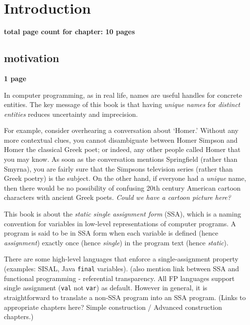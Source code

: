 \chapter{Introduction }

\textbf{total page count for chapter: 10 pages}


\section{motivation}

\textbf{1 page}


In computer programming, as in real life, 
names are useful handles for concrete entities.
The key message of this book is that
having \textit{unique names} for
\textit{distinct entities}
reduces uncertainty and imprecision.

For example, consider overhearing a conversation
about `Homer.' Without any more contextual clues, you
cannot disambiguate between Homer Simpson and Homer the
classical Greek poet; or indeed, any other people
called Homer that you may know.
As soon as the conversation mentions Springfield
(rather than Smyrna), you are fairly sure that the
Simpsons television series (rather than Greek poetry)
is the subject.
On the other hand, if everyone had a \textit{unique} name,
then there would be no possibility of confusing 20th century
American cartoon characters with ancient Greek poets.
\textit{Could we have a cartoon picture here?}

This book is about the \textit{static single assignment form} (SSA),
which is a naming convention for variables in low-level representations
of computer programs.
A program is said to be in SSA form when each variable is defined (hence
\textit{assignment})
exactly once (hence \textit{single}) in the program text
(hence \textit{static}).

There are some high-level languages that enforce
a single-assignment property (examples: SISAL, Java \texttt{final} variables). 
(also mention link between SSA and functional programming -
referential transparency. All FP languages support single assignment
(\texttt{val} not \texttt{var}) as default.
However in general,
it is straightforward to translate a non-SSA program into an SSA
program. (Links to appropriate chapters here?
Simple construction / Advanced construction chapters.)

